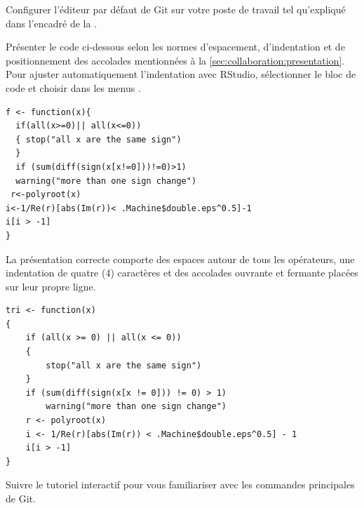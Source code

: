 \begin{exercice}[nosol]
  Configurer l'éditeur par défaut de Git sur votre poste de travail
  tel qu'expliqué dans l'encadré de la
  .
\end{exercice}

\begin{exercice}
  Présenter le code ci-dessous selon les normes d'espacement,
  d'indentation et de positionnement des accolades mentionnées à la
  \autoref{sec:collaboration:presentation}. Pour ajuster
  automatiquement l'indentation avec RStudio, sélectionner le bloc de
  code et choisir dans les menus .

\begin{Schunk}
\begin{Verbatim}
f <- function(x){
  if(all(x>=0)|| all(x<=0))
  { stop("all x are the same sign")
  }
  if (sum(diff(sign(x[x!=0]))!=0)>1)
  warning("more than one sign change")
 r<-polyroot(x)
i<-1/Re(r)[abs(Im(r))< .Machine$double.eps^0.5]-1
i[i > -1]
}
\end{Verbatim}
\end{Schunk}
\begin{sol}
  La présentation correcte comporte des espaces autour de tous les
  opérateurs, une indentation de quatre (4) caractères et des
  accolades ouvrante et fermante placées sur leur propre ligne.
\begin{Schunk}
\begin{Verbatim}[fontsize=\relsize{-1}]
tri <- function(x)
{
    if (all(x >= 0) || all(x <= 0))
    {
        stop("all x are the same sign")
    }
    if (sum(diff(sign(x[x != 0])) != 0) > 1)
        warning("more than one sign change")
    r <- polyroot(x)
    i <- 1/Re(r)[abs(Im(r)) < .Machine$double.eps^0.5] - 1
    i[i > -1]
}
\end{Verbatim}
\end{Schunk}
\end{sol}
\end{exercice}

\begin{exercice}[nosol]
  Suivre le tutoriel interactif 
  pour vous familiariser avec les commandes principales de Git.
\end{exercice}


